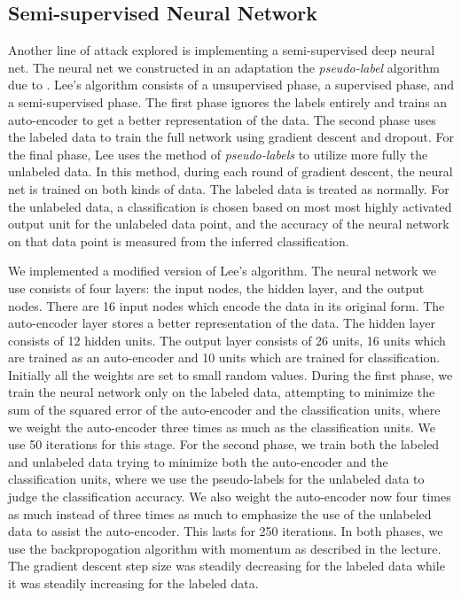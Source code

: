 \documentclass[11pt]{article}
\begin{document}
\subsection{Semi-supervised Neural Network}

Another line of attack explored is implementing a semi-supervised deep neural net. The neural net we constructed in an adaptation the \emph{pseudo-label} algorithm due to \cite{Lee:2013}. Lee's algorithm consists of a unsupervised phase, a supervised phase, and a semi-supervised phase. The first phase ignores the labels entirely and trains an auto-encoder to get a better representation of the data. The second phase uses the labeled data to train the full network using gradient descent and dropout. For the final phase, Lee uses the method of \emph{pseudo-labels} to utilize more fully the unlabeled data. In this method, during each round of gradient descent, the neural net is trained on both kinds of data. The labeled data is treated as normally. For the unlabeled data, a classification is chosen based on most most highly activated output unit for the unlabeled data point, and the accuracy of the neural network on that data point is measured from the inferred classification.

We implemented a modified version of Lee's algorithm. The neural network we use consists of four layers: the input nodes, the hidden layer, and the output nodes. There are 16 input nodes which encode the data in its original form. The auto-encoder layer stores a better representation of the data. The hidden layer consists of 12 hidden units. The output layer consists of 26 units, 16 units which are trained as an auto-encoder and 10 units which are trained for classification. Initially all the weights are set to small random values. During the first phase, we train the neural network only on the labeled data, attempting to minimize the sum of the squared error of the auto-encoder and the classification units, where we weight the auto-encoder three times as much as the classification units. We use 50 iterations for this stage. For the second phase, we train both the labeled and unlabeled data trying to minimize both the auto-encoder and the classification units, where we use the pseudo-labels for the unlabeled data to judge the classification accuracy. We also weight the auto-encoder now four times as much instead of three times as much to emphasize the use of the unlabeled data to assist the auto-encoder. This lasts for 250 iterations. In both phases, we use the backpropogation algorithm with momentum as described in the lecture. The gradient descent step size was steadily decreasing for the labeled data while it was steadily increasing for the labeled data.
\end{document}
